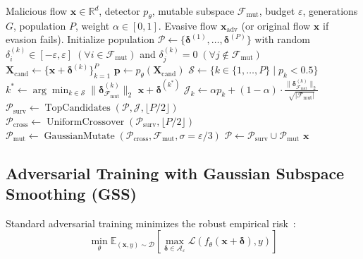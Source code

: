\documentclass[iicol,pdflatex,sn-mathphys-num]{sn-jnl}
\begin{document}
\begin{algorithm}[htbp]
\caption{Feature-Constrained Multi-Objective Evolutionary Evasion (FCEE)}
\label{alg:ga}
\footnotesize
\begin{algorithmic}[1]
\Require Malicious flow $\mathbf{x} \in \mathbb{R}^d$, detector $p_\theta$, mutable subspace $\mathcal{F}_{\text{mut}}$, budget $\varepsilon$, generations $G$, population $P$, weight $\alpha \in [0, 1]$.
\Ensure Evasive flow $\mathbf{x}_{\text{adv}}$ (or original flow $\mathbf{x}$ if evasion fails).
\State Initialize population $\mathcal{P} \leftarrow \{\boldsymbol{\delta}^{(1)}, \dots, \boldsymbol{\delta}^{(P)}\}$ with random $\delta^{(k)}_i \in [-\varepsilon, \varepsilon] \; (\forall i \in \mathcal{F}_{\text{mut}})$ and $\delta^{(k)}_j = 0 \; (\forall j \notin \mathcal{F}_{\text{mut}})$
    \State $\mathbf{X}_{\text{cand}} \leftarrow \{\mathbf{x} + \boldsymbol{\delta}^{(k)}\}_{k=1}^P$
    \State $\mathbf{p} \leftarrow p_\theta(\mathbf{X}_{\text{cand}})$
    \State $\mathcal{S} \leftarrow \{k \in \{1, \dots, P\} \mid p_k < 0.5\}$
        \State $k^* \leftarrow \arg\min_{k \in \mathcal{S}} \|\boldsymbol{\delta}^{(k)}_{\mathcal{F}_{\text{mut}}}\|_2$
        \State \Return $\mathbf{x} + \boldsymbol{\delta}^{(k^*)}$
    \EndIf
        \State $\mathcal{J}_k \leftarrow \alpha p_k + (1-\alpha) \cdot \frac{\|\boldsymbol{\delta}^{(k)}_{\mathcal{F}_{\text{mut}}}\|_2}{\sqrt{|\mathcal{F}_{\text{mut}}|}}$
    \EndFor
    \State $\mathcal{P}_{\text{surv}} \leftarrow \operatorname{TopCandidates}(\mathcal{P}, \boldsymbol{\mathcal{J}}, \lfloor P/2 \rfloor)$
    \State $\mathcal{P}_{\text{cross}} \leftarrow \operatorname{UniformCrossover}(\mathcal{P}_{\text{surv}}, \lfloor P/2 \rfloor)$
    \State $\mathcal{P}_{\text{mut}} \leftarrow \operatorname{GaussianMutate}(\mathcal{P}_{\text{cross}}, \mathcal{F}_{\text{mut}}, \sigma = \varepsilon/3)$
    \State $\mathcal{P} \leftarrow \mathcal{P}_{\text{surv}} \cup \mathcal{P}_{\text{mut}}$
\EndFor
\State \Return $\mathbf{x}$
\end{algorithmic}
\end{algorithm}

\subsection{Adversarial Training with Gaussian Subspace Smoothing (GSS)}
\label{sec:gss}
Standard adversarial training minimizes the robust empirical risk~\cite{madry2018towards}:
\begin{equation}
    \min_\theta \mathbb{E}_{(\mathbf{x}, y) \sim \mathcal{D}} \left[ \max_{\boldsymbol{\delta} \in \mathcal{A}_\varepsilon} \mathcal{L}(f_\theta(\mathbf{x} + \boldsymbol{\delta}), y) \right]
\end{equation}
\end{document}
